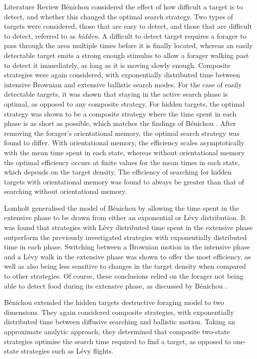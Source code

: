 \begin{section}{Literature Review \label{sec:litreview}}
Bénichou \etal \cite{Benichou_2006_intermittent} considered the effect of how difficult a target is to detect, and whether this changed the optimal search strategy.
Two types of targets were considered, those that are easy to detect, and those that are difficult to detect, referred to as \emph{hidden}.
A difficult to detect target requires a forager to pass through the area multiple times before it is finally located, whereas an easily detectable target emits a strong enough stimulus to allow a forager walking past to detect it immediately, as long as it is moving slowly enough.
Composite strategies were again considered, with exponentially distributed time between intensive Brownian and extensive ballistic search modes.
For the case of easily detectable targets, it was shown that staying in the active search phase is optimal, as opposed to any composite strategy.
For hidden targets, the optimal strategy was shown to be a composite strategy where the time spent in each phase is as short as possible, which matches the findings of Bénichou \etal \cite{Benichou_2005}.
After removing the forager's orientational memory, the optimal search strategy was found to differ.
With orientational memory, the efficiency scales asymptotically with the mean time spent in each state, whereas without orientational memory the optimal efficiency occurs at finite values for the mean times in each state, which depends on the target density.
The efficiency of searching for hidden targets with orientational memory was found to always be greater than that of searching without orientational memory.

Lomholt \etal \cite{Lomholt_2008} generalised the model of B\'{e}nichou \cite{Benichou_2006_intermittent} by allowing the time spent in the extensive phase to be drawn from either an exponential or L\'{e}vy distribution.
It was found that strategies with L\'{e}vy distributed time spent in the extensive phase outperform the previously investigated strategies with exponentially distributed time in each phase.
Switching between a Brownian motion in the intensive phase and a L\'{e}vy walk in the extensive phase was shown to offer the most efficiency, as well as also being less sensitive to changes in the target density when compared to other strategies.
Of course, these conclusions relied on the forager not being able to detect food during its extensive phase, as discussed by B\'{e}nichou \etal \cite{Benichou_2006_intermittent}.

Bénichou \etal \cite{Benichou_2006} extended the hidden targets destructive foraging model \cite{Benichou_2005} to two dimensions.
They again considered composite strategies, with exponentially distributed time between diffusive searching and ballistic motion.
Taking an approximate analytic approach, they determined that composite two-state strategies optimise the search time required to find a target, as opposed to one-state strategies such as L\'{e}vy flights.


\end{section}
